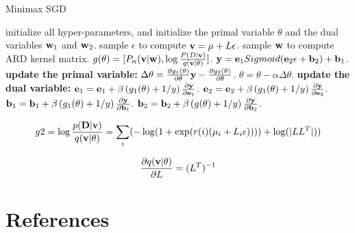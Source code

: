 \documentclass{article}
\def\e{{\bf e}}
\def\b{{\bf b}}
\def\v{{\bf v}}
\def\y{{\bf y}}
\def\w{{\bf w}}
\def\D{{\bf D}}
\begin{document}
\begin{algorithm}[!t]
    \caption{Minimax SGD}
    \label{algorithm_vrkm_plus_plus}
    \begin{algorithmic}[1]
        \State initialize all hyper-parameters, and initialize the primal variable $\theta$ and the dual variables $\w_1$ and $\w_2$.
        \State sample $\epsilon$ to compute $\v=\mu+L\epsilon$.
        \State sample $\w$ to compute ARD kernel matrix.
        \State $g(\theta) = [P_{\alpha}(\v|\w), \log\frac{P(D|\v)}{q(\v|\theta)}]$.
        \State $\y=\e_1 Sigmoid( \e_2 \epsilon + \b_2) + \b_1$.
        \State \textbf{update the primal variable:} 
        \State $\Delta \theta = \frac{\partial g_1(\theta) }{\partial \theta} \y - \frac{\partial g_2(\theta) }{\partial \theta}$.
        \State $\theta = \theta - \alpha \Delta \theta$.
        \State \textbf{update the dual variable:} 
        \State $\e_1 = \e_1 + \beta \left (g_1(\theta) + 1/y \right)\frac{\partial \y}{\partial \e_1}$.
        \State $\e_2 = \e_2 + \beta \left (g_1(\theta) + 1/y \right)\frac{\partial \y}{\partial \e_2} $.
        \State $\b_1 = \b_1 + \beta \left ( g_1(\theta) + 1/y\right)\frac{\partial \y}{\partial \b_1}$.
        \State $\b_2 = \b_2 + \beta \left ( g(\theta) + 1/y \right)\frac{\partial \y}{\partial \b_2}$.
        \EndFor
    \end{algorithmic}
\end{algorithm}


\begin{eqnarray}
\setlength{\abovedisplayskip}{0pt}
\setlength{\belowdisplayskip}{0pt}
\nonumber
g2 = \log \frac{p(\D|\v)}{q(\v|\theta)} = \sum_i (-\log (1+\exp(r(i)(\mu_i+L_i\epsilon))))+\log(|LL^{T}|))
\end{eqnarray}


\begin{eqnarray}
\setlength{\abovedisplayskip}{0pt}
\setlength{\belowdisplayskip}{0pt}
\nonumber
\frac{\partial q(\v|\theta)}{\partial L} =  (L^{T})^{-1}
\end{eqnarray}



\section*{References}



\end{document}
